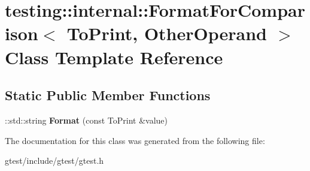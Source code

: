 \hypertarget{classtesting_1_1internal_1_1FormatForComparison}{}\section{testing\+:\+:internal\+:\+:Format\+For\+Comparison$<$ To\+Print, Other\+Operand $>$ Class Template Reference}
\label{classtesting_1_1internal_1_1FormatForComparison}
\subsection*{Static Public Member Functions}
\begin{DoxyCompactItemize}
\item 
\mbox{\label{classtesting_1_1internal_1_1FormatForComparison_a2aeb688fc55b57abd3021d82eccad896}} 
\+::std\+::string {\bfseries Format} (const To\+Print \&value)
\end{DoxyCompactItemize}


The documentation for this class was generated from the following file\+:\begin{DoxyCompactItemize}
\item 
gtest/include/gtest/gtest.\+h\end{DoxyCompactItemize}
